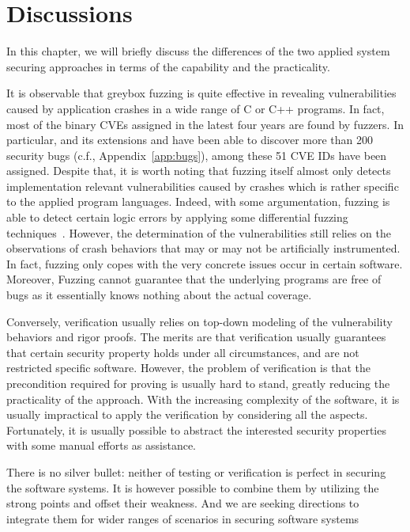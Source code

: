 
\chapter{Discussions} \label{ch:discuss}
In this chapter, we will briefly discuss the differences of the two applied system securing approaches in terms of the capability and the practicality.

It is observable that greybox fuzzing is quite effective in revealing vulnerabilities caused by application crashes in a wide range of C or C++ programs. In fact, most of the binary CVEs assigned in the latest four years are found by fuzzers. In particular, \FOT and its extensions \dFOT and \mtfuzz have been able to discover more than 200 security bugs (c.f., Appendix~\ref{app:bugs}), among these 51 CVE IDs have been assigned. Despite that, it is worth noting that fuzzing itself almost only detects implementation relevant vulnerabilities caused by crashes which is rather specific to the applied program languages. Indeed, with some argumentation, fuzzing is able to detect certain logic errors by applying some differential fuzzing techniques~\cite{nezha}. However, the determination of the vulnerabilities still relies on the observations of crash behaviors that may or may not be artificially instrumented. In fact, fuzzing only copes with the very concrete issues occur in certain software. Moreover, Fuzzing cannot guarantee that the underlying programs are free of bugs as it essentially knows nothing about the actual coverage.

Conversely, verification usually relies on top-down modeling of the vulnerability behaviors and rigor proofs. The merits are that verification usually guarantees that certain security property holds under all circumstances, and are not restricted specific software. However, the problem of verification is that the precondition required for proving is usually hard to stand, greatly reducing the practicality of the approach. With the increasing complexity of the software, it is usually impractical to apply the verification by considering all the aspects. Fortunately, it is usually possible to abstract the interested security properties with some manual efforts as assistance.

There is no silver bullet: neither of testing or verification is perfect in securing the software systems. It is however possible to combine them by utilizing the strong points and offset their weakness. And we are seeking directions to integrate them for wider ranges of scenarios in securing software systems